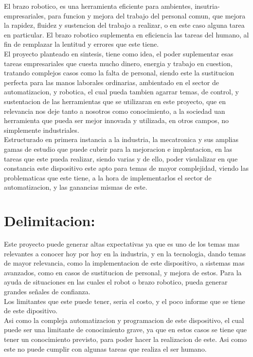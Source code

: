 \documentclass[14pt,a4paper]{article}
\begin{document}
El brazo robotico, es una herramienta eficiente para ambientes, insutria-empresariales, para funcion y mejora del trabajo del personal comun, que mejora la rapidez, fluidez y sustencion del trabajo a realizar, o en este caso alguna tarea en particular. El brazo robotico suplementa en eficiencia las tareas del humano, al fin de remplazar la lentitud y errores que este tiene.\\
El proyecto planteado en sintesis, tiene como idea, el  poder suplementar esas tareas empresariales que cuesta mucho dinero, energia y trabajo en cuestion, tratando complejos casos como la falta de personal, siendo este la sustitucion perfecta para las manos laborales ordinarias, ambientado en el sector de automatizacion, y robotica, el cual pueda tambien agarrar temas, de control, y sustentacion de las herramientas que se utilizaran en este proyecto, que en relevancia nos deje tanto a nosotros como conocimiento, a la sociedad uan herramienta que pueda ser mejor innovada y utilizada, en otros campos, no simplemente industriales.\\
Estructurado en primera instancia a la industria, la mecatronica y sus amplias gamas de estudio que puede cubrir para la mejoracion e implentacion, en las tareas que este pueda realizar, siendo varias y de ello, poder visulalizar en que constancia este dispositivo este apto para temas de mayor complejidad, viendo las problematicas que este tiene, a la  hora de implementarlos el sector de automatizacion, y las ganancias mismas de este.

\section{Delimitacion:}

Este proyecto puede generar altas expectativas ya que es uno de los temas mas relevantes a conocer hoy por hoy en la industria, y en la tecnologia, dando temas de mayor relevancia, como la implementacion de este dispositivo, a sistemas mas avanzados, como en casos de sustitucion de personal, y mejora de estos. Para la ayuda de situaciones en las cuales el robot o brazo robotico, pueda generar grandes señales de confianza.\\
Los limitantes que este puede tener, seria el costo, y el poco informe que se tiene de este dipositivo.\\
Asi como la compleja automatizacion y programacion de este dispositivo, el cual puede ser una limitante de conocimiento grave, ya que en estos casos se tiene que tener un conocimiento previsto, para poder hacer la realizacion de este. Asi como este no puede cumplir con algunas tareas que realiza el ser humano.
\end{document}
